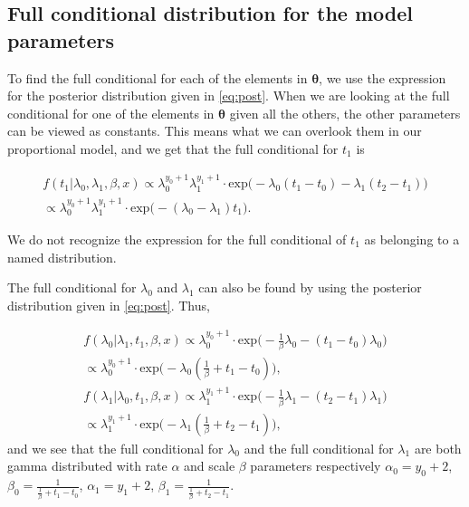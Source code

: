 \subsection{Full conditional distribution for the model parameters} \label{full_cond}

To find the full conditional for each of the elements in $\boldsymbol{\theta}$, we use the expression for the posterior distribution given in \eqref{eq:post}. When we are looking at the full conditional for one of the elements in $\boldsymbol{\theta}$ given all the others, the other parameters can be viewed as constants. This means what we can overlook them in our proportional model, and we get that the full conditional for $t_1$ is

\begin{align}
    f(t_1 | \lambda_0, \lambda_1, \beta, x) \propto 
    \lambda_0^{y_0 + 1} \lambda_1^{y_1 + 1} \cdot \text{exp} \Big( -\lambda_0(t_1 - t_0) - \lambda_1 (t_2 - t_1) \Big) \nonumber \\
    \propto  \lambda_0^{y_0 + 1} \lambda_1^{y_1 + 1} \cdot \text{exp} \Big( -(\lambda_0 - \lambda_1)t_1 \Big).
\end{align}

We do not recognize the expression for the full conditional of $t_1$ as belonging to a named distribution. 

The full conditional for $\lambda_0$ and $\lambda_1$ can also be found by using the posterior distribution given in \eqref{eq:post}. Thus, 

\begin{align}
    f(\lambda_0 | \lambda_1, t_1, \beta, x) \propto
    \lambda_0^{y_0 + 1}\cdot \text{exp} \Big( -\frac{1}{\beta} \lambda_0 - (t_1 - t_0)\lambda_0 \Big) 
    \nonumber \\
    \propto  \lambda_0^{y_0 + 1} \cdot \text{exp} \Big( - \lambda_0 (\frac{1}{\beta} + t_1 - t_0) \Big),
     \\
    f(\lambda_1 | \lambda_0, t_1, \beta, x) \propto
    \lambda_1^{y_1 + 1}\cdot \text{exp} \Big( -\frac{1}{\beta} \lambda_1 - (t_2 - t_1)\lambda_1 \Big) \nonumber \\
    \propto  \lambda_1^{y_1 + 1} \cdot \text{exp} \Big( - \lambda_1 (\frac{1}{\beta} + t_2 - t_1) \Big),
\end{align}
and we see that the full conditional for $\lambda_0$ and the full conditional for $\lambda_1$ are both gamma distributed with rate $\alpha$ and scale $\beta$ parameters respectively $\alpha_0 = y_0 + 2$, $\beta_0 = \frac{1}{\frac{1}{\beta} + t_1 - t_0}$, $\alpha_1 = y_1 + 2$, $\beta_1 = \frac{1}{\frac{1}{\beta} + t_2 - t_1}$. 



